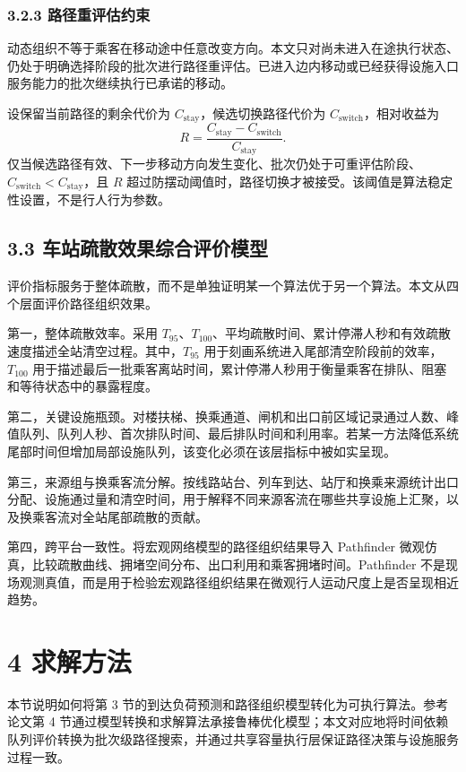 \documentclass[UTF8,a4paper,12pt]{ctexart}
\begin{document}
\subsubsection{3.2.3 路径重评估约束}

动态组织不等于乘客在移动途中任意改变方向。本文只对尚未进入在途执行状态、仍处于明确选择阶段的批次进行路径重评估。已进入边内移动或已经获得设施入口服务能力的批次继续执行已承诺的移动。

设保留当前路径的剩余代价为 \(C_{\mathrm{stay}}\)，候选切换路径代价为 \(C_{\mathrm{switch}}\)，相对收益为
\[
R=\frac{C_{\mathrm{stay}}-C_{\mathrm{switch}}}{C_{\mathrm{stay}}}.
\]
仅当候选路径有效、下一步移动方向发生变化、批次仍处于可重评估阶段、\(C_{\mathrm{switch}}<C_{\mathrm{stay}}\)，且 \(R\) 超过防摆动阈值时，路径切换才被接受。该阈值是算法稳定性设置，不是行人行为参数。

\subsection{3.3 车站疏散效果综合评价模型}

评价指标服务于整体疏散，而不是单独证明某一个算法优于另一个算法。本文从四个层面评价路径组织效果。

第一，整体疏散效率。采用 \(T_{95}\)、\(T_{100}\)、平均疏散时间、累计停滞人秒和有效疏散速度描述全站清空过程。其中，\(T_{95}\) 用于刻画系统进入尾部清空阶段前的效率，\(T_{100}\) 用于描述最后一批乘客离站时间，累计停滞人秒用于衡量乘客在排队、阻塞和等待状态中的暴露程度。

第二，关键设施瓶颈。对楼扶梯、换乘通道、闸机和出口前区域记录通过人数、峰值队列、队列人秒、首次排队时间、最后排队时间和利用率。若某一方法降低系统尾部时间但增加局部设施队列，该变化必须在该层指标中被如实呈现。

第三，来源组与换乘客流分解。按线路站台、列车到达、站厅和换乘来源统计出口分配、设施通过量和清空时间，用于解释不同来源客流在哪些共享设施上汇聚，以及换乘客流对全站尾部疏散的贡献。

第四，跨平台一致性。将宏观网络模型的路径组织结果导入 Pathfinder 微观仿真，比较疏散曲线、拥堵空间分布、出口利用和乘客拥堵时间。Pathfinder 不是现场观测真值，而是用于检验宏观路径组织结果在微观行人运动尺度上是否呈现相近趋势。

\section{4 求解方法}

本节说明如何将第 3 节的到达负荷预测和路径组织模型转化为可执行算法。参考论文第 4 节通过模型转换和求解算法承接鲁棒优化模型；本文对应地将时间依赖队列评价转换为批次级路径搜索，并通过共享容量执行层保证路径决策与设施服务过程一致。
\end{document}
